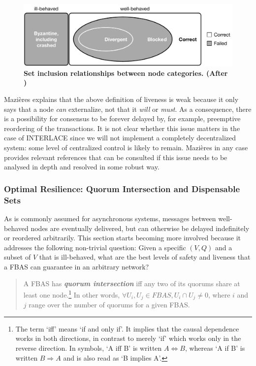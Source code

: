 \begin{figure}[h]
\centering
\includegraphics[width=14 cm]{Figures/correct}
\caption{\bf \small Set inclusion relationships between node categories. (After \cite{Mazieres2016})}
\label{fig:correct}
\end{figure}

Mazi\`eres explains that the above definition of liveness is weak because it only says that a node \emph{can} externalize, not that it \emph{will} or \emph{must}. As a consequence, there is a possibility for consensus to be forever delayed by, for example, preemptive reordering of the transactions. It is not clear whether this issue matters in the case of INTERLACE since we will not implement a completely decentralized system: some level of centralized control is likely to remain. Mazi\`eres in any case provides relevant references that can be consulted if this issue needs to be analysed in depth and resolved in some robust way.

\subsubsection{Optimal Resilience: Quorum Intersection and Dispensable Sets\\}
As is commonly assumed for asynchronous systems, messages between well-behaved nodes are eventually delivered, but can otherwise be delayed indefinitely or reordered arbitrarily. This section starts becoming more involved because it addresses the following non-trivial question: Given a specific $(V, Q)$ and a subset of $V$ that is ill-behaved, what are the best levels of safety and liveness that a FBAS can guarantee in an arbitrary network?
\begin{quote}
\vspace{-0.6cm}
\small
\begin{defin}
\label{QI}
A FBAS has \emph{\textbf{quorum intersection}} iff any two of its quorums share at least one node.\footnote{The term `iff' means `if and only if'. It implies that the causal dependence works in both directions, in contrast to merely `if' which works only in the reverse direction. In symbols, `A iff B' is written $A \Leftrightarrow B$, whereas `A if B' is written $B \Rightarrow A$ and is also read as `B implies A'.} In other words, $\forall U_i, U_j \in FBAS, U_i \cap U_j \ne 0$, where $i$ and $j$ range over the number of quorums for a given FBAS.
\end{defin}
\end{quote}

